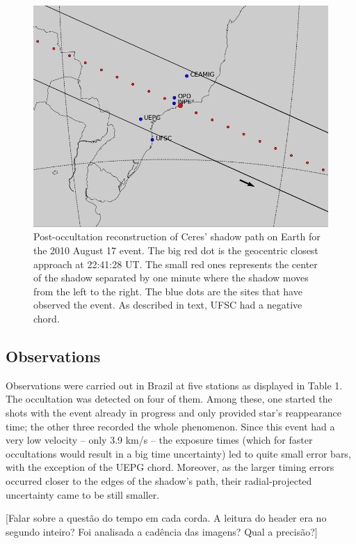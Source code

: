 \documentclass[useAMS,usenatbib]{mn2e}
\begin{document}
\begin{figure}
\includegraphics[scale=0.42]{figures/Ceres_2010.png} 
\caption{Post-occultation reconstruction of Ceres' shadow path on Earth for the 2010 August 17 event. The big red dot is the geocentric closest approach at 22:41:28 UT. The small red ones represents the center of the shadow separated by one minute where the shadow moves from the left to the right. The blue dots are the sites that have observed the event. As described in text, UFSC had a negative chord.
\label{Fig: Ceres-2010-map}}
\end{figure}



\subsection{Observations}

Observations were carried out in Brazil at five stations as displayed in Table 1. The occultation was detected on four of them. Among these, one started the shots with the event already in progress and only provided star's reappearance time; the other three recorded the whole phenomenon.  Since this event had a very low velocity -- only 3.9 km/s -- the exposure times (which for faster occultations would result in a big time uncertainty) led to quite small error bars, with the exception of the UEPG chord. Moreover, as the larger timing errors occurred closer to the edges of the shadow's path, their radial-projected uncertainty came to be still smaller.

[Falar sobre a quest\~ao do tempo em cada corda. A leitura do header era no segundo inteiro? Foi analisada a cad\^encia das imagens? Qual a precis\~ao?]
\end{document}

